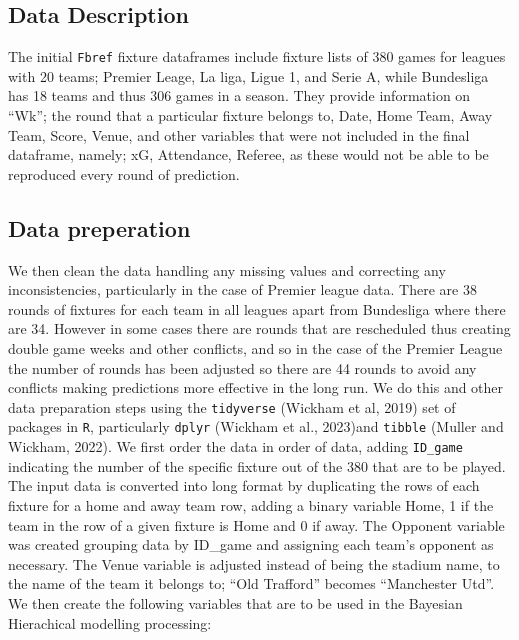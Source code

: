 \documentclass[
]{article}
\begin{document}
\hypertarget{data-description}{%
\subsection{Data Description}\label{data-description}}

The initial \texttt{Fbref} fixture dataframes include fixture lists of
380 games for leagues with 20 teams; Premier Leage, La liga, Ligue 1,
and Serie A, while Bundesliga has 18 teams and thus 306 games in a
season. They provide information on ``Wk''; the round that a particular
fixture belongs to, Date, Home Team, Away Team, Score, Venue, and other
variables that were not included in the final dataframe, namely; xG,
Attendance, Referee, as these would not be able to be reproduced every
round of prediction.

\hypertarget{data-preperation}{%
\subsection{Data preperation}\label{data-preperation}}

We then clean the data handling any missing values and correcting any
inconsistencies, particularly in the case of Premier league data. There
are 38 rounds of fixtures for each team in all leagues apart from
Bundesliga where there are 34. However in some cases there are rounds
that are rescheduled thus creating double game weeks and other
conflicts, and so in the case of the Premier League the number of rounds
has been adjusted so there are 44 rounds to avoid any conflicts making
predictions more effective in the long run. We do this and other data
preparation steps using the \texttt{tidyverse} (Wickham et al, 2019) set
of packages in \texttt{R}, particularly \texttt{dplyr} (Wickham et al.,
2023)and \texttt{tibble} (Muller and Wickham, 2022). We first order the
data in order of data, adding \texttt{ID\_game} indicating the number of
the specific fixture out of the 380 that are to be played. The input
data is converted into long format by duplicating the rows of each
fixture for a home and away team row, adding a binary variable Home, 1
if the team in the row of a given fixture is Home and 0 if away. The
Opponent variable was created grouping data by ID\_game and assigning
each team's opponent as necessary. The Venue variable is adjusted
instead of being the stadium name, to the name of the team it belongs
to; ``Old Trafford'' becomes ``Manchester Utd''. We then create the
following variables that are to be used in the Bayesian Hierachical
modelling processing:
\end{document}
